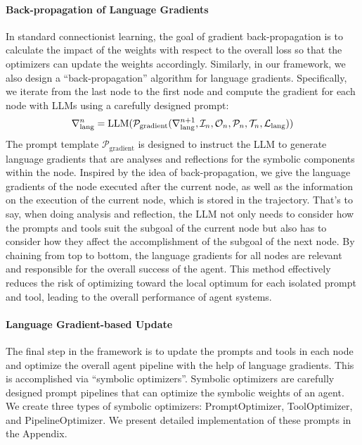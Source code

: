 \paragraph{Back-propagation of Language Gradients}
In standard connectionist learning, the goal of gradient back-propagation is to calculate the impact of the weights with respect to the overall loss so that the optimizers can update the weights accordingly. Similarly, in our framework, we also design a ``back-propagation'' algorithm for language gradients. Specifically, we iterate from the last node to the first node and compute the gradient for each node with LLMs using a carefully designed prompt: 
\begin{equation}
    \nabla_{\text{lang}}^n = \text{LLM}(\mathcal{P}_{\text{gradient}}(\nabla_{\text{lang}}^{n+1}, \mathcal{I}_n, \mathcal{O}_n, \mathcal{P}_n, \mathcal{T}_n, \mathcal{L}_{\text{lang}}))
\end{equation}
The prompt template $\mathcal{P}_{\text{gradient}}$ is designed to instruct the LLM to generate language gradients that are analyses and reflections for the symbolic components within the node. Inspired by the idea of back-propagation, we give the language gradients of the node executed after the current node, as well as the information on the execution of the current node, which is stored in the trajectory. That's to say, when doing analysis and reflection, the LLM not only needs to consider how the prompts and tools suit the subgoal of the current node but also has to consider how they affect the accomplishment of the subgoal of the next node. By chaining from top to bottom, the language gradients for all nodes are relevant and responsible for the overall success of the agent. This method effectively reduces the risk of optimizing toward the local optimum for each isolated prompt and tool, leading to the overall performance of agent systems. 

\paragraph{Language Gradient-based Update}
The final step in the framework is to update the prompts and tools in each node and optimize the overall agent pipeline with the help of language gradients. This is accomplished via ``symbolic optimizers''. Symbolic optimizers are carefully designed prompt pipelines that can optimize the symbolic weights of an agent. We create three types of symbolic optimizers: PromptOptimizer, ToolOptimizer, and PipelineOptimizer. We present detailed implementation of these prompts in the Appendix.

